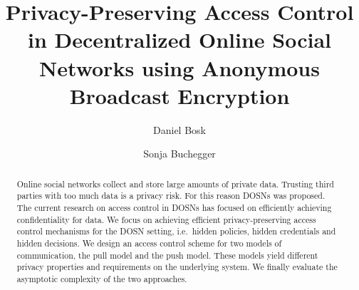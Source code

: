 \title{%
  Privacy-Preserving Access Control in
  Decentralized Online Social Networks using
  Anonymous Broadcast Encryption
}
\author{%
  Daniel Bosk \and
  Sonja Buchegger
}


\mode* %

\begin{abstract}
  Online social networks collect and store large amounts of private data.
  Trusting third parties with too much data is a privacy risk.
  For this reason \acp{DOSN} was proposed.
  The current research on access control in \acp{DOSN} has focused on 
  efficiently achieving confidentiality for data.
  We focus on achieving efficient privacy-preserving access control mechanisms 
  for the \ac{DOSN} setting, i.e.~hidden policies, hidden credentials and 
  hidden decisions.
  We design an access control scheme for two models of communication, the pull 
  model and the push model.
  These models yield different privacy properties and requirements on the 
  underlying system.
  We finally evaluate the asymptotic complexity of the two approaches.

\end{abstract}


